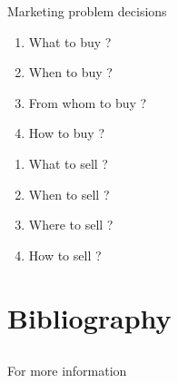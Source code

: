 \documentclass[12pt,ignorenonframetext,aspectratio=169]{beamer}
\providecommand{\tightlist}{%
  \setlength{\itemsep}{0pt}\setlength{\parskip}{0pt}}
\begin{document}
\begin{frame}{Marketing problem decisions}
\protect\hypertarget{marketing-problem-decisions}{}
\begin{block}{}
\protect\hypertarget{section-8}{}
\begin{enumerate}
\tightlist
\item
  What to buy ?
\item
  When to buy ?
\item
  From whom to buy ?
\item
  How to buy ?
\end{enumerate}
\end{block}

\begin{block}{}
\protect\hypertarget{section-9}{}
\begin{enumerate}
\tightlist
\item
  What to sell ?
\item
  When to sell ?
\item
  Where to sell ?
\item
  How to sell ?
\end{enumerate}
\end{block}
\end{frame}

\hypertarget{bibliography}{%
\section{Bibliography}\label{bibliography}}

\hypertarget{section-10}{%
\subsection{}\label{section-10}}

\begin{frame}{For more information}
\protect\hypertarget{for-more-information}{}
\end{frame}
\end{document}
